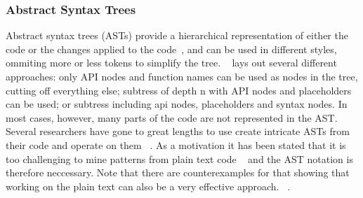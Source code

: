 \documentclass[
	a4paper,
	pagesize,
	pdftex,
	12pt,
	twoside, %
	BCOR=5mm, %
	ngerman,
	fleqn,
	final,
	]{scrartcl}
\begin{document}
\subsubsection{Abstract Syntax Trees}
Abstract syntax trees (ASTs) provide a hierarchical representation of either the code or the changes applied to the code~\cite{Liu.2018}, and can be used in different styles, ommiting more or less tokens to simplify the tree. ~\cite{Yamaguchi.2012} lays out several different approaches: only API nodes and function names can be used as nodes in the tree, cutting off everything else; subtress of depth n with API nodes and placeholders can be used; or subtress including api nodes, placeholders and syntax nodes. In most cases, however, many parts of the code are not represented in the AST.\\ Several researchers have gone to great lengths to use create intricate ASTs from their code and operate on them ~\cite{Ma.2017,Yamaguchi.2012}. As a motivation it has been stated that it is too challenging to mine patterns from plain text code ~\cite{Liu.2018} and the AST notation is therefore neccessary. Note that there are counterexamples for that showing that working on the plain text can also be a very effective approach. ~\cite{Russell.2018,Hovsepyan.2012}.\\
\end{document}
